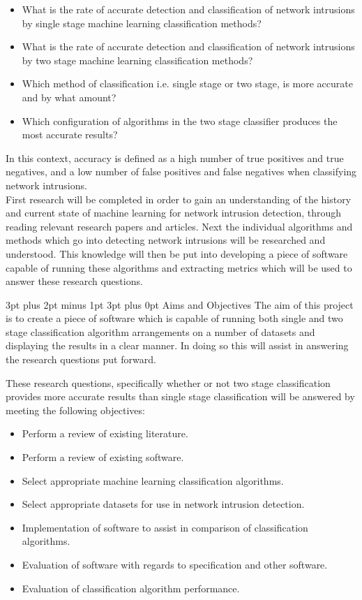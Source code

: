 \documentclass[12pt,a4paper]{article}
\makeatletter
\renewcommand\subsection{\@startsection {subsection}{1}{2mm} %
      {3pt plus 2pt minus 1pt} %
      {3pt plus 0pt} %
      {\normalfont\bfseries}}
\makeatother
\begin{document}
		\begin{itemize}
			\item What is the rate of accurate detection and classification of network intrusions by single stage machine learning classification methods?
			\item What is the rate of accurate detection and classification of network intrusions by two stage machine learning classification methods?
			\item Which method of classification i.e. single stage or two stage, is more accurate and by what amount?
			\item Which configuration of algorithms in the two stage classifier produces the most accurate results?
		\end{itemize}
		
In this context, accuracy is defined as a high number of true positives and true negatives, and a low number of false positives and false negatives when classifying network intrusions. \\

	First research will be completed in order to gain an understanding of the history and current state of machine learning for network intrusion detection, through reading relevant research papers and articles. Next the individual algorithms and methods which go into detecting network intrusions will be researched and understood. This knowledge will then be put into developing a piece of software capable of running these algorithms and extracting metrics which will be used to answer these research questions.

\subsection{Aims and Objectives}
	The aim of this project is to create a piece of software which is capable of running both single and two stage classification algorithm arrangements on a number of datasets and displaying the results in a clear manner. In doing so this will assist in answering the research questions put forward.

	These research questions, specifically whether or not two stage classification provides more accurate results than single stage classification will be answered by meeting the following objectives:
\begin{itemize}
\item{Perform a review of existing literature.}
\item{Perform a review of existing software.}
\item{Select appropriate machine learning classification algorithms.}
\item{Select appropriate datasets for use in network intrusion detection.}
\item{Implementation of software to assist in comparison of classification algorithms.}
\item{Evaluation of software with regards to specification and other software.}
\item{Evaluation of classification algorithm performance.}
\end{itemize}
\end{document}
